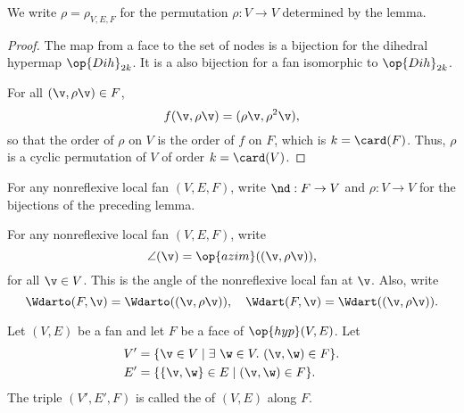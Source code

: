 \begin{definition}[$\rho$]
We write $\rho=\rho_{V,E,F}$ for the permutation $\rho:V\to V$
determined by the lemma.
\end{definition}


\begin{proof} The map from a face to the set of nodes is a bijection
  for the dihedral hypermap $\op{Dih}_{2k}$. It is a also bijection
  for a fan isomorphic to $\op{Dih}_{2k}$.

For all $(\v,\rho \v)\in F$,
\[ 
f(\v,\rho \v) = (\rho\v,\rho^2\v),
\] 
so that the order of $\rho$ on $V$ is the order of $f$ on $F$, which
is $k=\card(F)$.  Thus, $\rho$ is a cyclic permutation of $V$ of order
$k=\card(V)$.
\end{proof}

\begin{definition}[$\rho$,~$\nd$] 
For any nonreflexive local fan $(V,E,F)$, write
$\nd:F\to V$ and $\rho:V\to V$ for the bijections of the preceding
lemma.
\end{definition}
%
%

\begin{definition}
For any nonreflexive local fan $(V,E,F)$,
write
\[ 
\angle(\v) = \op{azim}((\v,\rho\v)),
\] 
for all $\v\in V$.  This is the  angle of the
nonreflexive local fan at $\v$.  Also, write
\[ 
  \Wdarto(F,\v) = \Wdarto((\v,\rho \v)),\quad 
\Wdart(F,\v) =\Wdart((\v,\rho \v)).
\] 
%
%
%
\end{definition}


\begin{definition}[localization]
 Let $(V,E)$ be a fan and let $F$ be
a face of $\op{hyp}(V,E)$.  Let
\begin{align*}
V' &= \{\v\in V \mid \exists~\w\in V.~(\v,\w)\in F\}.\\
E' &= \{\{\v,\w\} \in E\mid (\v,\w)\in F\}.
\end{align*}
The triple $(V',E',F)$ is called the  of $(V,E)$ along $F$.
\end{definition}
%


